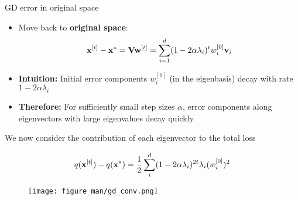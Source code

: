 \documentclass[11pt,compress,t,notes=noshow, xcolor=table]{beamer}
\begin{document}
\begin{vbframe}{GD error in original space}

\begin{itemize}
    \setlength{\itemsep}{1em}
    \item Move back to \textbf{original space}:
        \begin{equation*}
            \mathbf{x}^{[t]} - \mathbf{x}^\ast = \mathbf{V} \mathbf{w}^{[t]} = \sum_{i = 1}^{d} (1 - 2 \alpha \lambda_i)^t w_i^{[0]} \mathbf{v}_i 
        \end{equation*}
    \item \textbf{Intuition:} Initial error components $w^{[0]}_i$ (in the eigenbasis) decay with rate $1 - 2 \alpha \lambda_i$
    \item \textbf{Therefore:} For sufficiently small step sizes $\alpha$, error components along eigenvectors with large eigenvalues decay quickly
\end{itemize}

\framebreak

We now consider the contribution of each eigenvector to the total loss

\begin{equation*}
    q(\mathbf{x}^{[t]}) - q(\mathbf{x}^\ast) = \frac{1}{2} \sum_{i}^{d} (1 - 2 \alpha \lambda_i)^{2t} \lambda_i (w_i^{[0]})^2
\end{equation*}

\begin{figure}
	\texttt{[image: figure\_man/gd\_conv.png]} \\
\end{figure}



\end{vbframe}


\endlecture
\end{document}
